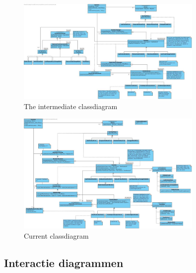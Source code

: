 \documentclass[i2]{oss}
\begin{document}
\begin{figure}[tbp]
\begin{center}
    \includegraphics[width=0.8\textwidth]{klassendiagram}
    \caption{The intermediate classdiagram}
	\label{fig:kd-tt}
\end{center}
\end{figure}




\begin{figure}[tbp]
\begin{center}
    \includegraphics[width=0.8\textwidth]{klassendiagram3}
    \caption{Current classdiagram}
	\label{fig:kd-h}
\end{center}
\end{figure}


\subsection{Interactie diagrammen}
\label{ssec:Interactiedia}








%
\end{document}
